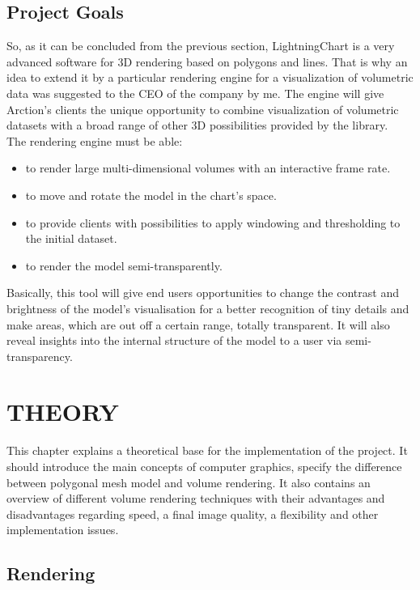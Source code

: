 \documentclass[twoside, english, 11pt]{report}
\begin{document}
\section{Project Goals}

So, as it can be concluded from the previous section, LightningChart is a very advanced software for 3D rendering based on polygons and lines. That is why an idea to extend it by a particular rendering engine for a visualization of volumetric data was suggested to the CEO of the company by me. The engine will give Arction's clients the unique opportunity to combine visualization of volumetric datasets with a broad range of other 3D possibilities provided by the library. \\

The rendering engine must be able:
\begin{itemize} 
\item to render large multi-dimensional volumes with an interactive frame rate.
\item to move and rotate the model in the chart's space.
\item to provide clients with possibilities to apply windowing and thresholding to the initial dataset.
\item to render the model semi-transparently.
\end{itemize}

Basically, this tool will give end users opportunities to change the contrast and brightness of the model's visualisation for a better recognition of tiny details and make areas, which are out off a certain range, totally transparent. It will also reveal insights into the internal structure of the model to a user via semi-transparency.

\chapter{THEORY}

This chapter explains a theoretical base for the implementation of the project. It should introduce the main concepts of computer graphics, specify the difference between polygonal mesh model and volume rendering. It also contains an overview of different volume rendering techniques with their advantages and disadvantages regarding speed, a final image quality, a flexibility and other implementation issues.

\section{Rendering}
\end{document}
